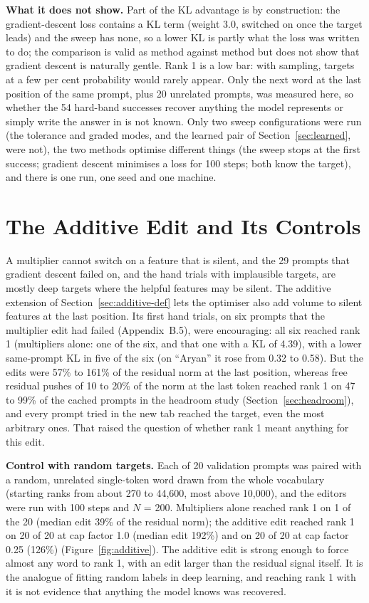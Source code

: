 \documentclass[12pt,a4paper]{report}
\begin{document}
\textbf{What it does not show.} Part of the KL advantage is by construction: the gradient-descent loss contains a KL term (weight 3.0, switched on once the target leads) and the sweep has none, so a lower KL is partly what the loss was written to do; the comparison is valid as method against method but does not show that gradient descent is naturally gentle. Rank 1 is a low bar: with sampling, targets at a few per cent probability would rarely appear. Only the next word at the last position of the same prompt, plus 20 unrelated prompts, was measured here, so whether the 54 hard-band successes recover anything the model represents or simply write the answer in is not known. Only two sweep configurations were run (the tolerance and graded modes, and the learned pair of Section~\ref{sec:learned}, were not), the two methods optimise different things (the sweep stops at the first success; gradient descent minimises a loss for 100 steps; both know the target), and there is one run, one seed and one machine.

\section{The Additive Edit and Its Controls}\label{sec:additive}

A multiplier cannot switch on a feature that is silent, and the 29 prompts that gradient descent failed on, and the hand trials with implausible targets, are mostly deep targets where the helpful features may be silent. The additive extension of Section~\ref{sec:additive-def} lets the optimiser also add volume to silent features at the last position. Its first hand trials, on six prompts that the multiplier edit had failed (Appendix~B.5), were encouraging: all six reached rank 1 (multipliers alone: one of the six, and that one with a KL of 4.39), with a lower same-prompt KL in five of the six (on ``Aryan'' it rose from 0.32 to 0.58). But the edits were 57\% to 161\% of the residual norm at the last position, whereas free residual pushes of 10 to 20\% of the norm at the last token reached rank 1 on 47 to 99\% of the cached prompts in the headroom study (Section~\ref{sec:headroom}), and every prompt tried in the new tab reached the target, even the most arbitrary ones. That raised the question of whether rank 1 meant anything for this edit.

\textbf{Control with random targets.} Each of 20 validation prompts was paired with a random, unrelated single-token word drawn from the whole vocabulary (starting ranks from about 270 to 44,600, most above 10,000), and the editors were run with 100 steps and $N$ = 200. Multipliers alone reached rank 1 on 1 of the 20 (median edit 39\% of the residual norm); the additive edit reached rank 1 on 20 of 20 at cap factor 1.0 (median edit 192\%) and on 20 of 20 at cap factor 0.25 (126\%) (Figure~\ref{fig:additive}). The additive edit is strong enough to force almost any word to rank 1, with an edit larger than the residual signal itself. It is the analogue of fitting random labels in deep learning, and reaching rank 1 with it is not evidence that anything the model knows was recovered.
\end{document}
